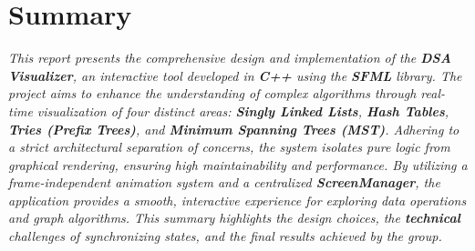\section{Summary}

\textit{This report presents the comprehensive design and implementation of the \textbf{DSA Visualizer}, an interactive tool developed in \textbf{C++} using the \textbf{SFML} library. The project aims to enhance the understanding of complex algorithms through real-time visualization of four distinct areas: \textbf{Singly Linked Lists}, \textbf{Hash Tables}, \textbf{Tries (Prefix Trees)}, and \textbf{Minimum Spanning Trees (MST)}. Adhering to a strict architectural separation of concerns, the system isolates pure logic from graphical rendering, ensuring high maintainability and performance. By utilizing a frame-independent animation system and a centralized \textbf{ScreenManager}, the application provides a smooth, interactive experience for exploring data operations and graph algorithms. This summary highlights the design choices, the \textbf{technical} challenges of synchronizing states, and the final results achieved by the group.}

\clearpage